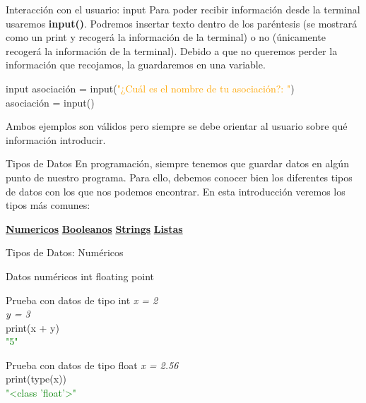 \documentclass{beamer}
\begin{document}
\begin{frame}{Interacción con el usuario: input}
Para poder recibir información desde la terminal usaremos \textbf{input()}. Podremos insertar texto dentro de los paréntesis (se mostrará como un print y recogerá la información de la terminal) o no (únicamente recogerá la información de la terminal).
Debido a que no queremos perder la información que recojamos, la guardaremos en una variable.
\begin{Programexample}{input}
asociación = input(\textcolor{orange}{"¿Cuál es el nombre de tu asociación?: "})\\
asociación = input()
\end{Programexample}
Ambos ejemplos son válidos pero siempre se debe orientar al usuario sobre qué información introducir.
\end{frame}

\begin{frame}{Tipos de Datos}
En programación, siempre tenemos que guardar datos en algún punto de nuestro programa. Para ello, debemos conocer bien los diferentes tipos de datos con los que nos podemos encontrar. En esta introducción veremos los tipos más comunes:
\vspace{1cm}

\centering\hyperlink{datos:numericos}{\textbf{Numericos}}
\hspace{1cm} \hyperlink{datos:booleanos}{\textbf{Booleanos}}
\hspace{1cm} \hyperlink{datos:strings}{\textbf{Strings}}
\hspace{1cm} \hyperlink{datos:listas}{\textbf{Listas}}
\end{frame}

\begin{frame} {Tipos de Datos: Numéricos}
\label{datos:numericos}
\begin{block}{Datos numéricos}
int
floating point
\end{block}
\begin{Programexample}{Prueba con datos de tipo int}
\centering
\textit{x = 2}\\
\textit{y = 3}\\
print(x + y)\\
\textcolor{green}{"5"}
\end{Programexample}
\begin{Programexample}{Prueba con datos de tipo float}
\centering\textit{x = 2.56}\\
print(type(x)) \\
\textcolor{green}{"<class 'float'>"}
\end{Programexample}
\end{frame}
\end{document}
